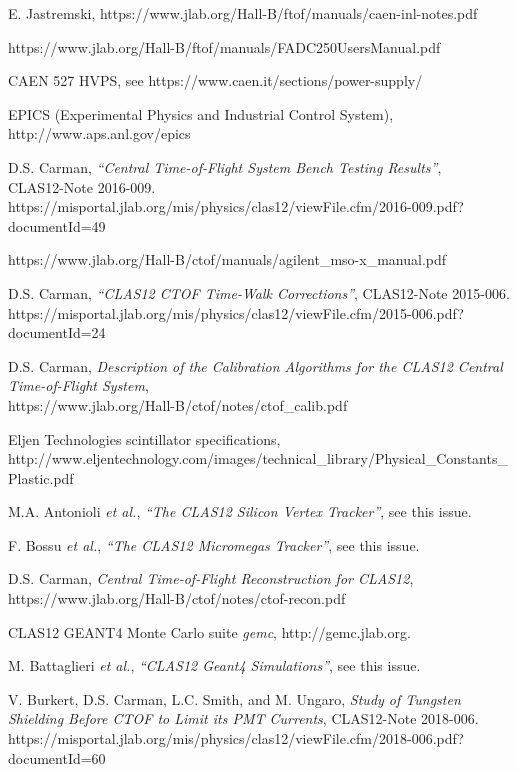 \documentclass{elsart}
\begin{document}
\begin{thebibliography}{99}
E. Jastremski, https://www.jlab.org/Hall-B/ftof/manuals/caen-inl-notes.pdf

https://www.jlab.org/Hall-B/ftof/manuals/FADC250UsersManual.pdf
  
CAEN 527 HVPS, see https://www.caen.it/sections/power-supply/
  
EPICS (Experimental Physics and Industrial Control System),\\ http://www.aps.anl.gov/epics

D.S. Carman, {\it ``Central Time-of-Flight System Bench Testing Results''},\\
CLAS12-Note 2016-009.\\
https://misportal.jlab.org/mis/physics/clas12/viewFile.cfm/2016-009.pdf?documentId=49

https://www.jlab.org/Hall-B/ctof/manuals/agilent\_mso-x\_manual.pdf

D.S. Carman, {\it ``CLAS12 CTOF Time-Walk Corrections''}, CLAS12-Note 2015-006.\\
https://misportal.jlab.org/mis/physics/clas12/viewFile.cfm/2015-006.pdf?documentId=24

D.S. Carman, {\it Description of the Calibration Algorithms for the CLAS12 Central Time-of-Flight System},\\
https://www.jlab.org/Hall-B/ctof/notes/ctof\_calib.pdf

Eljen Technologies scintillator specifications,\\
http://www.eljentechnology.com/images/technical\_library/Physical\_Constants\_Plastic.pdf

M.A. Antonioli {\it et al.}, {\it ``The CLAS12 Silicon Vertex Tracker''}, see this issue.

F. Bossu {\it et al.}, {\it ``The CLAS12 Micromegas Tracker''}, see this issue.
  
D.S. Carman, {\it Central Time-of-Flight Reconstruction for CLAS12},\\
https://www.jlab.org/Hall-B/ctof/notes/ctof-recon.pdf

CLAS12 GEANT4 Monte Carlo suite {\it gemc}, http://gemc.jlab.org.

M. Battaglieri {\it et al.}, {\it ``CLAS12 Geant4 Simulations''}, see this issue.
  
V. Burkert, D.S. Carman, L.C. Smith, and M. Ungaro, {\it Study of Tungsten Shielding Before CTOF to Limit
its PMT Currents}, CLAS12-Note 2018-006.\\
https://misportal.jlab.org/mis/physics/clas12/viewFile.cfm/2018-006.pdf?documentId=60
  
\end{thebibliography}
\end{document}
